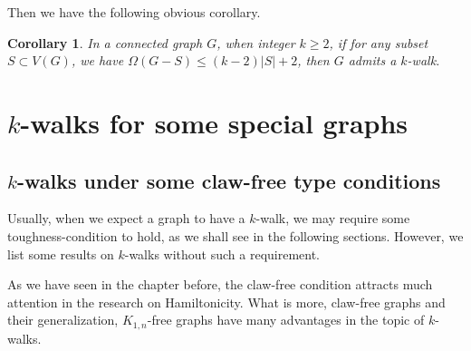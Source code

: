 \documentclass[12pt]{report}
\newtheorem{corollary}{Corollary}
\begin{document}
Then we have the following obvious corollary.
\begin{corollary}\label{cor24injw90}
In a connected graph $G$, when integer $k\ge2$, if for any subset $S\subset V(G)$, we have $\Omega(G-S)\le(k-2)|S|+2$, then $G$ admits a $k$-walk.
\end{corollary}









\section{$k$-walks for some special graphs}

\subsection{$k$-walks under some claw-free type conditions}

Usually, when we expect a graph to have a $k$-walk, we may require some toughness-condition to hold, as we shall see in the following sections. However, we list some results on $k$-walks without such a requirement.

As we have seen in the chapter before, the claw-free condition attracts much attention in the research on Hamiltonicity. What is more, claw-free graphs and their generalization, $K_{1,n}$-free graphs have many advantages in the topic of $k$-walks.
\end{document}
